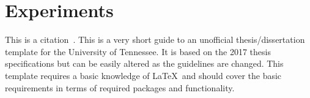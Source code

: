 \chapter{Experiments} \label{chapter2}

This is a citation~\cite{utk:idr2016optimization}.
This is a very short guide to an unofficial thesis/dissertation template
for the University of Tennessee.
It is based on the 2017 thesis specifications but can be easily altered
as the guidelines are changed.
This template requires a basic knowledge of \LaTeX\ and should cover
the basic requirements in terms of required packages and functionality.

